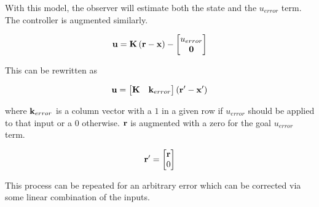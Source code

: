 With this model, the observer will estimate both the state and the $u_{error}$
term. The controller is augmented similarly.

\begin{equation*}
  \mathbf{u} = \mathbf{K} \left(\mathbf{r} - \mathbf{x}\right) -
  \begin{bmatrix}
    u_{error} \\
    \mathbf{0}
  \end{bmatrix}
\end{equation*}

This can be rewritten as

\begin{equation*}
  \mathbf{u} =
  \begin{bmatrix}
    \mathbf{K} & \mathbf{k}_{error}
  \end{bmatrix}
  \left(\mathbf{r}' - \mathbf{x}'\right)
\end{equation*}

where $\mathbf{k}_{error}$ is a column vector with a $1$ in a given row if
$u_{error}$ should be applied to that input or a $0$ otherwise. $\mathbf{r}$ is
augmented with a zero for the goal $u_{error}$ term.

\begin{equation*}
  \mathbf{r}' =
  \begin{bmatrix}
    \mathbf{r} \\
    0
  \end{bmatrix}
\end{equation*}

This process can be repeated for an arbitrary error which can be corrected via
some linear combination of the inputs.
